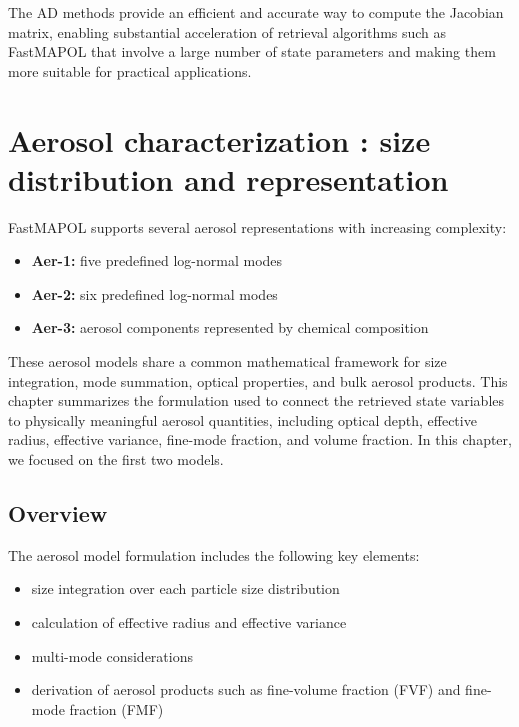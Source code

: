 \documentclass[
  letterpaper,
  open=any]{scrbook}
\providecommand{\tightlist}{%
  \setlength{\itemsep}{0pt}\setlength{\parskip}{0pt}}
\begin{document}
The AD methods provide an efficient and accurate way to compute the
Jacobian matrix, enabling substantial acceleration of retrieval
algorithms such as FastMAPOL that involve a large number of state
parameters and making them more suitable for practical applications.

\chapter{Aerosol characterization : size distribution and
representation}\label{aerosol-characterization-size-distribution-and-representation}

FastMAPOL supports several aerosol representations with increasing
complexity:

\begin{itemize}
\tightlist
\item
  \textbf{Aer-1:} five predefined log-normal modes
\item
  \textbf{Aer-2:} six predefined log-normal modes
\item
  \textbf{Aer-3:} aerosol components represented by chemical composition
\end{itemize}

These aerosol models share a common mathematical framework for size
integration, mode summation, optical properties, and bulk aerosol
products. This chapter summarizes the formulation used to connect the
retrieved state variables to physically meaningful aerosol quantities,
including optical depth, effective radius, effective variance, fine-mode
fraction, and volume fraction. In this chapter, we focused on the first
two models.

\section{Overview}\label{overview-2}

The aerosol model formulation includes the following key elements:

\begin{itemize}
\tightlist
\item
  size integration over each particle size distribution
\item
  calculation of effective radius and effective variance
\item
  multi-mode considerations
\item
  derivation of aerosol products such as fine-volume fraction (FVF) and
  fine-mode fraction (FMF)
\end{itemize}
\end{document}

